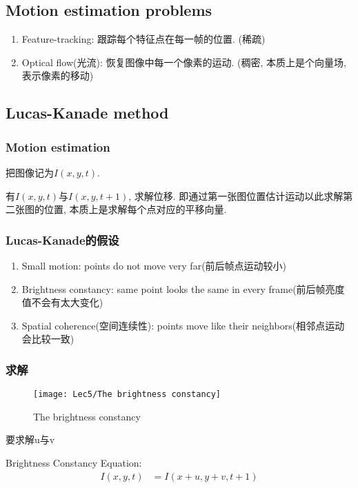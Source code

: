 \subsection{Motion estimation problems}
\begin{enumerate}
    \item Feature-tracking: 跟踪每个特征点在每一帧的位置. (稀疏)
    \item Optical flow(光流): 恢复图像中每一个像素的运动. (稠密, 本质上是个向量场, 表示像素的移动)
\end{enumerate}

\subsection{Lucas-Kanade method}
 
\subsubsection{Motion estimation}
把图像记为$I(x,y,t)$.

有$I(x,y,t)$与$I(x,y,t+1)$, 求解位移. 即通过第一张图位置估计运动以此求解第二张图的位置, 本质上是求解每个点对应的平移向量. 

\subsubsection{Lucas-Kanade的假设}
\begin{enumerate}
    \item Small motion: points do not move very far(前后帧点运动较小)
    \item Brightness constancy: same point looks the same in every frame(前后帧亮度值不会有太大变化)
    \item Spatial coherence(空间连续性): points move like their neighbors(相邻点运动会比较一致)
\end{enumerate}

\subsubsection{求解}
\begin{figure}[H]
    \centering
    \texttt{[image: Lec5/The brightness constancy]}
    \caption{The brightness constancy}
\end{figure}

要求解u与v

Brightness Constancy Equation:
\begin{align*}
    I(x,y,t)&=I(x+u,y+v,t+1)\\
\end{align*}

